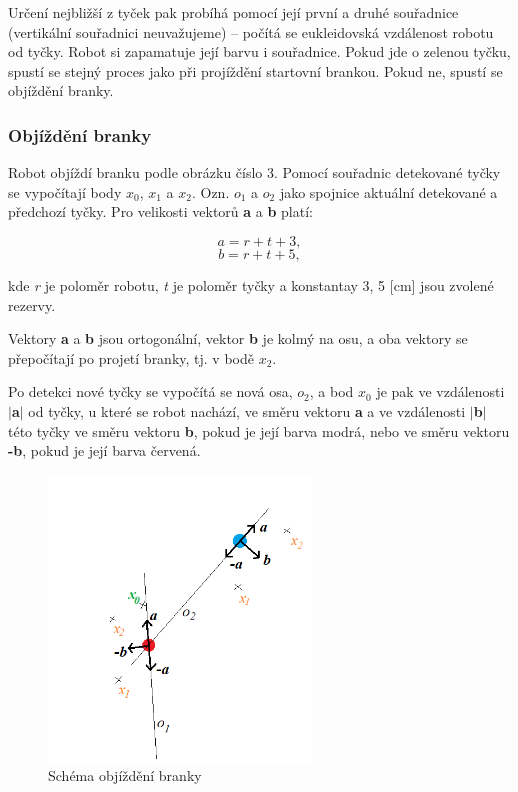 \documentclass{article}
\begin{document}
	Určení nejbližší z tyček pak probíhá pomocí její první a druhé souřadnice (vertikální souřadnici neuvažujeme) -- počítá se eukleidovská vzdálenost robotu od tyčky.  Robot si zapamatuje její barvu i souřadnice. Pokud jde o zelenou tyčku, spustí se stejný proces jako při projíždění startovní brankou. Pokud ne, spustí se objíždění branky. 

\subsubsection{Objíždění branky}

	Robot objíždí branku podle obrázku číslo 3. Pomocí souřadnic detekované tyčky se vypočítají body $x_{0}$, $x_{1}$ a $x_{2}$. Ozn. $o_{1}$ a $o_{2}$ jako spojnice aktuální detekované a předchozí tyčky. Pro velikosti vektorů \textbf{a} a \textbf{b} platí:
	
\begin{equation}	
	 a = r + t + 3,
\end{equation}
\begin{equation}
	b = r + t + 5,
\end{equation}

kde {\it r} je poloměr robotu, {\it t} je poloměr tyčky a konstantay 3, 5 [cm] jsou zvolené rezervy.

	Vektory \textbf{a} a \textbf{b} jsou ortogonální, vektor \textbf{b} je kolmý na osu, a oba vektory se přepočítají po projetí branky, tj. v bodě $x_{2}$.

	Po detekci nové tyčky se vypočítá se nová osa, $o_{2}$, a bod $x_{0}$ je pak ve vzdálenosti $\vert$\textbf{a}$\vert$ od tyčky, u které se robot nachází, ve směru vektoru \textbf{a} a ve vzdálenosti $\vert$\textbf{b}$\vert$ této tyčky ve směru vektoru \textbf{b}, pokud je její barva modrá, nebo ve směru vektoru \textbf{-b}, pokud je její barva červená.

\begin{figure}[h]
	\centering
	\includegraphics[width=7cm]{schema.png}
	\caption{Schéma objíždění branky}
\end{figure}
	
\end{document}
